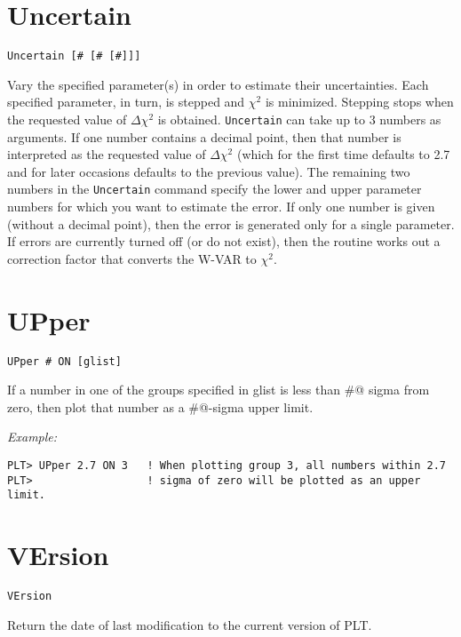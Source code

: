\section*{Uncertain}
\begin{verbatim}
Uncertain [# [# [#]]]
\end{verbatim}
   Vary the specified parameter(s) in order to estimate their
uncertainties.  Each specified parameter, in turn, is stepped and
$\chi^2$ is minimized.  Stepping stops when the requested value of
$\Delta\chi^2$ is obtained.  {\tt Uncertain} can take up to 3 numbers as
arguments.  If one number contains a decimal point, then that number
is interpreted as the requested value of $\Delta\chi^2$ (which for the
first time defaults to 2.7 and for later occasions defaults to the previous
value).  The remaining two numbers in the {\tt Uncertain} command specify
the lower and upper parameter numbers for which you want to estimate
the error.  If only one number is given (without a decimal point),
then the error is generated only for a single parameter.  If errors
are currently turned off (or do not exist), then the routine works
out a correction factor that converts the W-VAR to $\chi^2$.

\section*{UPper}
\begin{verbatim}
UPper # ON [glist]
\end{verbatim}
   If a number in one of the groups specified in glist is less than
\verb@#@ sigma from zero, then plot that number as a \verb@#@-sigma upper limit.

\medskip\noindent
{\em Example:}
\begin{verbatim}
PLT> UPper 2.7 ON 3   ! When plotting group 3, all numbers within 2.7
PLT>                  ! sigma of zero will be plotted as an upper limit.
\end{verbatim}

\section*{VErsion}
\begin{verbatim}
VErsion
\end{verbatim}
   Return the date of last modification to the current version of PLT.

